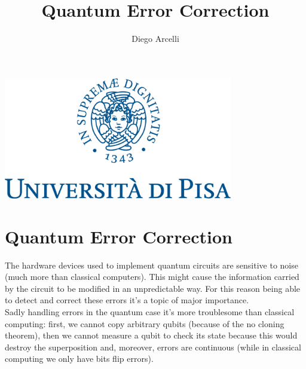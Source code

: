 \documentclass{article}
\begin{document}
	
	\begin{titlepage}
		
		\title{Quantum Error Correction}
		\author{Diego Arcelli}
		\maketitle
		\centering
		\includegraphics[width=10cm]{./images/unipi_logo.png}
		
	\end{titlepage}
	
	\tableofcontents
	\newpage
	
	\section{Quantum Error Correction}
	 
	The hardware devices used to implement quantum circuits are sensitive to noise (much more than classical computers). This might cause the information carried by the circuit to be modified in an unpredictable way. For this reason being able to detect and correct these errors it's a topic of major importance. \\
	Sadly handling errors in the quantum case it's more troublesome than classical computing: first, we cannot copy arbitrary qubits (because of the no cloning theorem), then we cannot measure a qubit to check its state because this would destroy the superposition and, moreover, errors are continuous (while in classical computing we only have bits flip errors).
	
\end{document}
